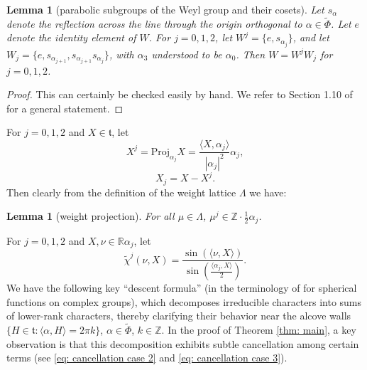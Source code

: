 \documentclass{amsart}
\numberwithin{equation}{section}
\newtheorem{lem}[thm]{Lemma}
\numberwithin{equation}{section}
\begin{document}
\begin{lem}[parabolic subgroups of the Weyl group and their cosets]\label{lem: parabolic}
Let $s_{\alpha}$ denote the reflection across the line through the origin orthogonal to $\alpha\in\widetilde{\Phi}$. Let $e$ denote the identity element of $W$. 
For $j=0,1,2$, let $W^j=\{e,s_{\alpha_j}\}$, and 
let $W_j=\{e, s_{\alpha_{j+1}},s_{\alpha_{j+1}}s_{\alpha_{j}}\}$, with $\alpha_{3}$ understood to be $\alpha_0$. 
Then $W=W^jW_j$ for $j=0,1,2$.
\end{lem}
\begin{proof}
    This can certainly be checked easily by hand. We refer to Section 1.10 of \cite{Hum90} for a general statement. 
\end{proof}

For $j=0,1,2$ and $X\in\mathfrak{t}$, 
let 
$$X^j=\mathrm{Proj}_{\alpha_j} X = \frac{\langle X, \alpha_j \rangle}{|\alpha_j|^2} \alpha_j,$$
$$X_j=X-X^j.$$
Then clearly from the definition of the weight lattice $\Lambda$ we have: 
\begin{lem}[weight projection]\label{lem: proj weights}
    For all $\mu\in \Lambda$, $\mu^j\in \mathbb{Z}\cdot\frac12\alpha_j$. 
\end{lem}

For $j=0,1,2$ and $X,\nu\in \mathbb{R}\alpha_j$, let 
$$\widetilde{\chi}^j(\nu,X)=\frac{\sin(\langle\nu, X\rangle)}{\sin(\frac{\langle \alpha_j, X\rangle}{2})}.$$
We have the following key ``descent formula'' (in the terminology of \cite{CN01} for spherical functions on complex groups), which decomposes irreducible characters into sums of lower-rank characters, thereby clarifying their behavior near the alcove walls $\{H\in\mathfrak{t}:\langle\alpha,H\rangle=2\pi k\}$, $\alpha\in\widetilde{\Phi}$, $k\in\mathbb{Z}$. In the proof of Theorem \ref{thm: main}, a key observation is that this decomposition exhibits subtle cancellation among certain terms (see \eqref{eq: cancellation case 2} and \eqref{eq: cancellation case 3}). 
\end{document}
